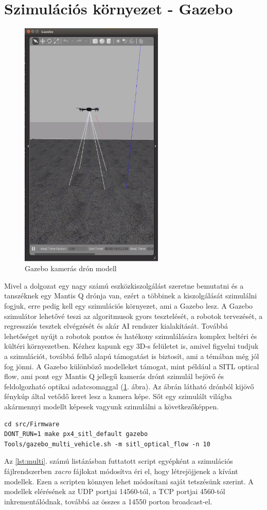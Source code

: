 \section{Szimulációs környezet - Gazebo}
\begin{figure}
	\centering
	\includegraphics[height=12cm]{figures/sitl_optical_flow.png}
	\caption{Gazebo kamerás drón modell}
	\label{fig:sitl_optical_flow}
\end{figure}
Mivel a dolgozat egy nagy számú eszközkiszolgálást szeretne bemutatni és a tanszéknek egy Mantis Q drónja van, ezért a többinek a kiszolgálását szimulálni fogjuk, erre pedig kell egy szimulációs környezet, ami a Gazebo lesz. A Gazebo szimulátor lehetővé teszi az algoritmusok gyors tesztelését, a robotok tervezését, a regressziós tesztek elvégzését és akár AI rendszer kialakítását. Továbbá lehetőséget nyújt a robotok pontos és hatékony szimulálására komplex beltéri és kültéri környezetben. Kézhez kapunk egy 3D-s felületet is, amivel figyelni tudjuk a szimulációt, továbbá felhő alapú támogatást is biztosít, ami a témában még jól fog jönni.
A Gazebo különböző modelleket támogat, mint például a SITL optical flow, ami pont egy Mantis Q jellegű kamerás drónt szimulál bejövő és feldolgozható optikai adatcsomaggal (\ref{fig:sitl_optical_flow}. ábra). Az ábrán látható drónból kijövő fénykúp által vetődő keret lesz a kamera képe.
Sőt egy szimulált világba akármennyi modellt képesek vagyunk szimulálni a következőképpen.
\begin{lstlisting}[caption={10 optikai adatfolyamos drón szimulálása Gazebo-val}, label={lst:multi}]
cd src/Firmware
DONT_RUN=1 make px4_sitl_default gazebo
Tools/gazebo_multi_vehicle.sh -m sitl_optical_flow -n 10
\end{lstlisting}
\noindent
Az \ref{lst:multi}. számú listázásban futtatott script egyépként a szimulációs fájlrendszerben \emph{xacro} fájlokat módosítva éri el, hogy létrejöjjenek a kívánt modellek. Ezen a scripten könnyen lehet módosítani saját tetszésünk szerint. A modellek elérésének az UDP portjai 14560-tól, a TCP portjai 4560-tól inkrementálódnak, továbbá az összes a 14550 porton broadcast-el. \cite{multi-vehicle}


